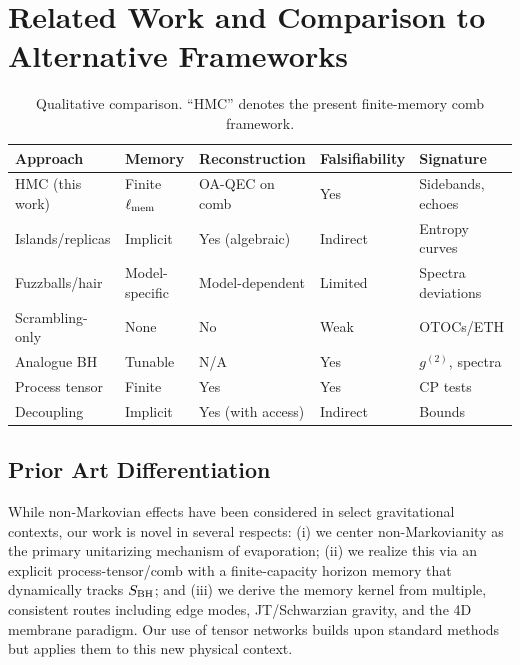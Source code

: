 \documentclass[11pt,a4paper]{article}
\newcommand{\HMC}{\textsc{HMC}\xspace}
\theoremstyle{plain}
\theoremstyle{definition}
\theoremstyle{remark}
\begin{document}
\section{Related Work and Comparison to Alternative Frameworks}
\label{sec:related-work}

\begin{table}[t]
\centering
\caption{Qualitative comparison. ``\HMC{}'' denotes the present finite-memory comb framework.}
\label{tab:rw-comparison}
\footnotesize
\begin{tabular*}{\textwidth}{@{\extracolsep{\fill}}lllll@{}}
\toprule
Approach & Memory & Reconstruction & Falsifiability & Signature \\
\midrule
\HMC{} (this work) & Finite $\ell_{\rm mem}$ & OA-QEC on comb & Yes & Sidebands, echoes \\
Islands/replicas & Implicit & Yes (algebraic) & Indirect & Entropy curves \\
Fuzzballs/hair & Model-specific & Model-dependent & Limited & Spectra deviations \\
Scrambling-only & None & No & Weak & OTOCs/ETH \\
Analogue BH & Tunable & N/A & Yes & $g^{(2)}$, spectra \\
Process tensor & Finite & Yes & Yes & CP tests \\
Decoupling & Implicit & Yes (with access) & Indirect & Bounds \\
\bottomrule
\end{tabular*}
\end{table}

\subsection{Prior Art Differentiation}
While non-Markovian effects have been considered in select gravitational contexts, our work is novel in several respects: (i) we center non-Markovianity as the primary unitarizing mechanism of evaporation; (ii) we realize this via an explicit process-tensor/comb with a finite-capacity horizon memory that dynamically tracks $S_{\rm BH}$; and (iii) we derive the memory kernel from multiple, consistent routes including edge modes, JT/Schwarzian gravity, and the 4D membrane paradigm. Our use of tensor networks builds upon standard methods~\cite{Schollwock:2011, Orus:2014} but applies them to this new physical context.
\end{document}
